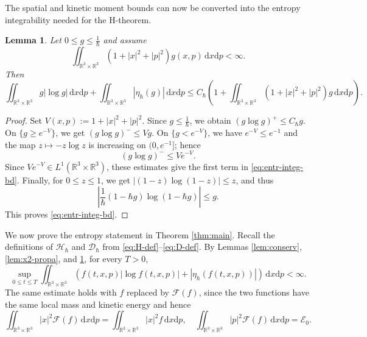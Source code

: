 \documentclass[10pt,reqno]{amsart}
\numberwithin{equation}{section}
\newtheorem{lemma}{Lemma}[section]
\theoremstyle{definition}
\newcommand{\R}{\mathbb R}
\newcommand{\dx}{\mathrm{d}x}
\newcommand{\dpp}{\mathrm{d}p}
\newcommand{\calE}{\mathcal E}
\newcommand{\calF}{\mathcal F}
\newcommand{\bq}{\begin{equation}}
\newcommand{\eq}{\end{equation}}
\newcommand{\lt}{\left}
\newcommand{\rt}{\right}
\begin{document}
The spatial and kinetic moment bounds can now be converted into the entropy integrability needed for the H-theorem.


\begin{lemma}\label{lem:entr-integ}
Let $0\leq g\leq\frac1\hbar $ and assume
\[
 \iint_{\R^3\times\R^3}(1+|x|^2+|p|^2)g(x,p)\,\dx\dpp<\infty.
\]
Then
\bq \label{eq:entr-integ-bd}
 \iint_{\R^3\times\R^3}g|\log g|\,\dx\dpp  +\iint_{\R^3\times\R^3}|\eta_\hbar(g)|\,\dx\dpp  \leq C_\hbar\lt(  1+\iint_{\R^3\times\R^3}(1+|x|^2+|p|^2)g\,\dx\dpp  \rt).
\eq
\end{lemma}

\begin{proof}
Set $V(x,p):=1+|x|^2+|p|^2$.  Since $g\leq\frac1\hbar $, we obtain $ (g\log g)^+\leq C_\hbar g$. On $\{g\geq e^{-V}\}$, we get $ (g\log g)^-\leq Vg$. On $\{g<e^{-V}\}$, we have $e^{-V}\leq e^{-1}$ and the map $z\mapsto-z\log z$ is increasing on $(0,e^{-1}]$; hence
\[
 (g\log g)^-\leq Ve^{-V}.
\]
Since $Ve^{-V}\in L^1(\R^3\times\R^3)$, these estimates give the first term in \eqref{eq:entr-integ-bd}.  Finally, for $0\leq z\leq1$, we get $|(1-z)\log(1-z)|\leq z$, and thus
\[
 \lt|\frac1\hbar(1-\hbar g)\log(1-\hbar g)\rt|\leq g.
\]
This proves \eqref{eq:entr-integ-bd}.
\end{proof}

We now prove the entropy statement in Theorem \ref{thm:main}.  Recall the definitions of $\mathscr H_\hbar$ and $\mathscr D_\hbar$ from \eqref{eq:H-def}--\eqref{eq:D-def}.  By Lemmas \ref{lem:conserv}, \ref{lem:x2-propa}, and \ref{lem:entr-integ}, for every $T>0$,
\bq \label{eq:entr-unif-f}
 \sup_{0\leq t\leq T}  \iint_{\R^3\times\R^3}  \lt(f(t,x,p)|\log f(t,x,p)|+|\eta_\hbar(f(t,x,p))|\rt) \,\dx\dpp<\infty.
\eq
The same estimate holds with $f$ replaced by $\calF(f)$, since the two functions have the same local mass and kinetic energy and hence
\[
 \iint_{\R^3\times\R^3}|x|^2\calF(f)\,\dx\dpp  =\iint_{\R^3\times\R^3}|x|^2f\,\dx\dpp,  \quad  \iint_{\R^3\times\R^3}|p|^2\calF(f)\,\dx\dpp  =\calE_0.
\]
\end{document}
